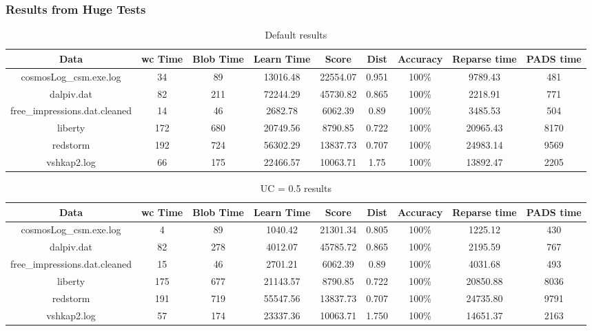 \subsubsection{Results from Huge Tests}
\begin{table*}[th]
\caption{Default results}
\begin{tabular}{|c||c|c|c|c|c|c|c|c|} \hline
Data & wc Time & Blob Time & Learn Time & Score & Dist & Accuracy & Reparse time & PADS time \\ \hline
cosmosLog\_csm.exe.log & 34 & 89 & 13016.48 & 22554.07& 0.951 & 100\% & 9789.43 & 481 \\ \hline
dalpiv.dat & 82 & 211 & 72244.29 & 45730.82 & 0.865 & 100\% & 2218.91 & 771 \\ \hline
free\_impressions.dat.cleaned & 14 & 46 & 2682.78 & 6062.39 & 0.89 & 100\% & 3485.53 & 504 \\ \hline
liberty & 172 & 680 & 20749.56 & 8790.85 & 0.722 & 100\% & 20965.43 & 8170 \\ \hline
redstorm & 192 & 724 & 56302.29 & 13837.73& 0.707 & 100\% & 24983.14 & 9569 \\ \hline
vshkap2.log & 66 & 175 & 22466.57 & 10063.71 & 1.75 & 100\% & 13892.47 & 2205 \\ \hline
\end{tabular}
\end{table*}

\begin{table*}[th]
\caption{UC = 0.5 results}
\begin{tabular}{|c||c|c|c|c|c|c|c|c|} \hline
Data & wc Time & Blob Time & Learn Time & Score & Dist & Accuracy & Reparse time & PADS time \\ \hline
cosmosLog\_csm.exe.log & 4 & 89 & 1040.42 & 21301.34 & 0.805 & 100\% & 1225.12 & 430 \\ \hline
dalpiv.dat & 82 & 278 & 4012.07 & 45785.72 & 0.865 & 100\% & 2195.59 & 767 \\ \hline
free\_impressions.dat.cleaned & 15 & 46 & 2701.21 & 6062.39 & 0.89 & 100\% & 4031.68 & 493 \\ \hline
liberty & 175 & 677 & 21143.57 & 8790.85 & 0.722 & 100\% & 20850.88 & 8036 \\ \hline
redstorm & 191 & 719 & 55547.56 & 13837.73 & 0.707 & 100\% & 24735.80 & 9791 \\ \hline
vshkap2.log & 57 & 174 & 23337.36 & 10063.71 & 1.750 & 100\% & 14651.37 & 2163 \\ \hline
\end{tabular}
\end{table*}
